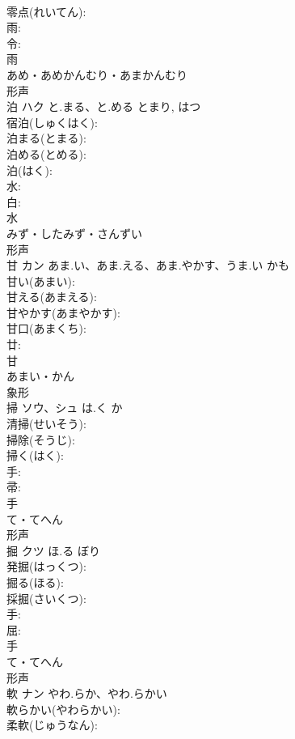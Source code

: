 \documentclass[8pt]{extreport}
\begin{document}
\begin{CJK}{UTF8}{min}
\\	零点(れいてん): 
\\	雨: 
\\	令: 
\\	雨	
\\	あめ・あめかんむり・あまかんむり	
\\	形声 
\\	泊	ハク	と.まる、と.める	とまり, はつ	
\\	宿泊(しゅくはく): 
\\	泊まる(とまる): 
\\	泊める(とめる): 
\\	泊(はく): 
\\	水: 
\\	白: 
\\	水	
\\	みず・したみず・さんずい	
\\	形声 
\\	甘	カン	あま.い、あま.える、あま.やかす、うま.い	かも	
\\	甘い(あまい): 
\\	甘える(あまえる): 
\\	甘やかす(あまやかす): 
\\	甘口(あまくち): 
\\	廿: 
\\	甘	
\\	あまい・かん	
\\	象形 
\\	掃	ソウ、シュ	は.く	か	
\\	清掃(せいそう): 
\\	掃除(そうじ): 
\\	掃く(はく): 
\\	手: 
\\	帚: 
\\	手	
\\	て・てへん	
\\	形声 
\\	掘	クツ	ほ.る	ぼり	
\\	発掘(はっくつ): 
\\	掘る(ほる): 
\\	採掘(さいくつ): 
\\	手: 
\\	屈: 
\\	手	
\\	て・てへん	
\\	形声 
\\	軟	ナン	やわ.らか、やわ.らかい		
\\	軟らかい(やわらかい): 
\\	柔軟(じゅうなん): 

\end{CJK}
\end{document}
